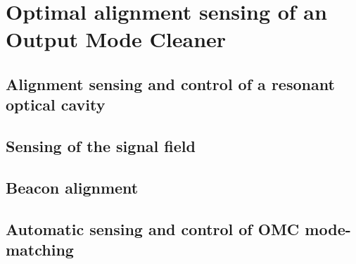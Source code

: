 \chapter{Optimal alignment sensing of an Output Mode Cleaner}

\section{Alignment sensing and control of a resonant optical cavity}

\section{Sensing of the signal field}

\section{Beacon alignment}

\section{Automatic sensing and control of OMC mode-matching}

